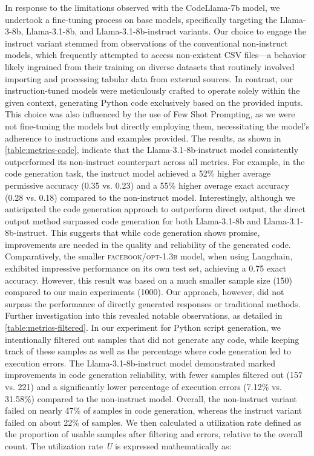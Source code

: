 \documentclass[logo,msc]{infthesis}           %
\begin{document}
In response to the limitations observed with the CodeLlama-7b model, we undertook a fine-tuning process on base models, specifically targeting the Llama-3-8b, Llama-3.1-8b, and Llama-3.1-8b-instruct variants. Our choice to engage the instruct variant stemmed from observations of the conventional non-instruct models, which frequently attempted to access non-existent CSV files—a behavior likely ingrained from their training on diverse datasets that routinely involved importing and processing tabular data from external sources. In contrast, our instruction-tuned models were meticulously crafted to operate solely within the given context, generating Python code exclusively based on the provided inputs. This choice was also influenced by the use of Few Shot Prompting, as we were not fine-tuning the models but directly employing them, necessitating the model's adherence to instructions and examples provided. The results, as shown in \ref{table:metrics-code}, indicate that the Llama-3.1-8b-instruct model consistently outperformed its non-instruct counterpart across all metrics. For example, in the code generation task, the instruct model achieved a 52\% higher average permissive accuracy (0.35 vs. 0.23) and a 55\% higher average exact accuracy (0.28 vs. 0.18) compared to the non-instruct model. Interestingly, although we anticipated the code generation approach to outperform direct output, the direct output method surpassed code generation for both Llama-3.1-8b and Llama-3.1-8b-instruct. This suggests that while code generation shows promise, improvements are needed in the quality and reliability of the generated code. Comparatively, the smaller \textsc{facebook/opt-1.3b} model, when using Langchain, exhibited impressive performance on its own test set, achieving a 0.75 exact accuracy. However, this result was based on a much smaller sample size (150) compared to our main experiments (1000). Our approach, however, did not surpass the performance of directly generated responses or traditional methods. Further investigation into this revealed notable observations, as detailed in \ref{table:metrics-filtered}. In our experiment for Python script generation, we intentionally filtered out samples that did not generate any code, while keeping track of these samples as well as the percentage where code generation led to execution errors. The Llama-3.1-8b-instruct model demonstrated marked improvements in code generation reliability, with fewer samples filtered out (157 vs. 221) and a significantly lower percentage of execution errors (7.12\% vs. 31.58\%) compared to the non-instruct model. Overall, the non-instruct variant failed on nearly 47\% of samples in code generation, whereas the instruct variant failed on about 22\% of samples. We then calculated a utilization rate defined as the proportion of usable samples after filtering and errors, relative to the overall count. The utilization rate \textit{U} is expressed mathematically as:
\end{document}
